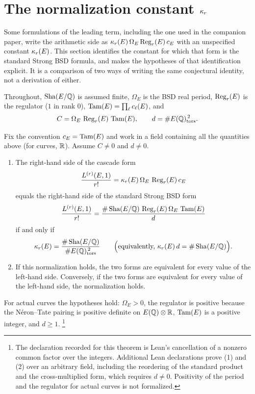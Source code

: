 \section[The normalization constant kappa-r]{The normalization constant $\kappa_r$}
\label{sec:kappa-normalization}

Some formulations of the leading term, including the one used in the
companion paper, write the arithmetic side as
$\kappa_r(E)\,\Omega_E\operatorname{Reg}_r(E)\,c_E$ with an unspecified constant
$\kappa_r(E)$.  This section identifies the constant for which that form is
the standard Strong BSD formula, and makes the hypotheses of that
identification explicit.  It is a comparison of two ways of writing the
same conjectural identity, not a derivation of either.

Throughout, $\operatorname{Sha}(E/\mathbb{Q})$ is assumed finite, $\Omega_E$ is the BSD real
period, $\operatorname{Reg}_r(E)$ is the regulator ($1$ in rank $0$), $\operatorname{Tam}(E)=\prod_\ell
c_\ell(E)$, and
\[
  C=\Omega_E\,\operatorname{Reg}_r(E)\,\operatorname{Tam}(E),
  \qquad
  d=\#E(\mathbb{Q})_{\operatorname{tors}}^{\,2}.
\]

\begin{theorem}\label{thm:apparatus:kappa-r-normalization-equivalence}
Fix the convention $c_E=\operatorname{Tam}(E)$ and work in a field containing all the
quantities above (for curves, $\mathbb{R}$).  Assume $C\neq0$ and $d\neq0$.
\begin{enumerate}
\item The right-hand side of the cascade form
  \[
    \frac{L^{(r)}(E,1)}{r!}=\kappa_r(E)\,\Omega_E\,\operatorname{Reg}_r(E)\,c_E
  \]
  equals the right-hand side of the standard Strong BSD form
  \[
    \frac{L^{(r)}(E,1)}{r!}
    =\frac{\#\operatorname{Sha}(E/\mathbb{Q})\,\operatorname{Reg}_r(E)\,\Omega_E\,\operatorname{Tam}(E)}{d}
  \]
  if and only if
  \[
    \kappa_r(E)=\frac{\#\operatorname{Sha}(E/\mathbb{Q})}{\#E(\mathbb{Q})_{\operatorname{tors}}^{\,2}}
    \qquad\Bigl(\text{equivalently, } \kappa_r(E)\,d=\#\operatorname{Sha}(E/\mathbb{Q})\Bigr).
  \]
\item If this normalization holds, the two forms are equivalent for every
  value of the left-hand side.  Conversely, if the two forms are
  equivalent for every value of the left-hand side, the normalization
  holds.
\end{enumerate}
For actual curves the hypotheses hold: $\Omega_E>0$, the regulator is
positive because the N\'eron--Tate pairing is positive definite on
$E(\mathbb{Q})\otimes\mathbb{R}$, $\operatorname{Tam}(E)$ is a positive integer, and $d\ge1$.%
\footnote{The declaration recorded for this theorem is Lean's cancellation
of a nonzero common factor over the integers.  Additional Lean
declarations prove (1) and (2) over an arbitrary field, including the
reordering of the standard product and the cross-multiplied form, which
requires $d\neq0$.  Positivity of the period and the regulator for actual
curves is not formalized.}
\end{theorem}

